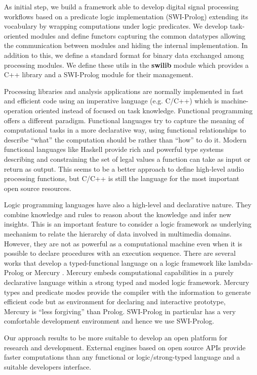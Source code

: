 \documentclass[runningheads]{llncs}
\begin{document}
As initial step, we build a framework able to develop digital signal processing workflows based on a predicate logic implementation (SWI-Prolog) extending its vocabulary by wrapping computations under logic predicates. We develop task-oriented modules and define functors capturing the common datatypes allowing the communication between modules and hiding the internal implementation. In addition to this, we define a standard format for binary data exchanged among processing modules. We define these utils in the \textbf{swilib} module which provides a C++ library and a SWI-Prolog module for their management.

Processing libraries and analysis applications are normally implemented in fast and efficient code using an imperative language (e.g. C/C++) which is machine-operation oriented instead of focused on task knowledge. Functional programming offers a different paradigm. Functional languages try to capture the meaning of computational tasks in a more declarative way, using functional relationships to describe ``what'' the computation should be rather than ``how'' to do it. Modern functional languages like Haskell \cite{haskell} provide rich and powerful type systems describing and constraining the set of legal values a function can take as input or return as output. This seems to be a better approach to define high-level audio processing functions, but C/C++ is still the language for the most important open source resources.

Logic programming languages have also a high-level and declarative nature. They combine knowledge and rules to reason about the knowledge and infer new insights. This is an important feature to consider a logic framework as underlying mechanism to relate the hierarchy of data involved in multimedia domains. However, they are not as powerful as a computational machine even when it is possible to declare procedures with an execution sequence. There are several works that develop a typed-functional language on a logic framework like lambda-Prolog or Mercury \cite{mercury}. Mercury embeds computational capabilities in a purely declarative language within a strong typed and moded logic framework. Mercury types and predicate modes provide the compiler with the information to generate efficient code but as environment for declaring and interactive prototype, Mercury is ``less forgiving'' than Prolog. SWI-Prolog in particular has a very comfortable development environment and hence we use SWI-Prolog.

Our approach results to be more suitable to develop an open platform for research and development. External engines based on open source APIs provide faster computations than any functional or logic/strong-typed language and a suitable developers interface.
\end{document}
